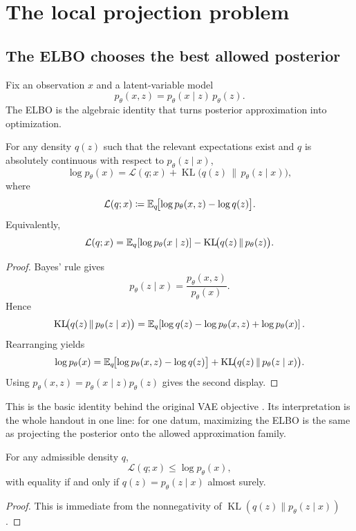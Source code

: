 \documentclass[11pt]{article}
\begin{document}
\section{The local projection problem}
\label{sec:local-projection}

\subsection{The ELBO chooses the best allowed posterior}
\label{subsec:elbo-projection}

Fix an observation \(x\) and a latent-variable model
\[
  p_\theta(x,z)=p_\theta(x\mid z)\,p_\theta(z).
\]
The ELBO is the algebraic identity that turns posterior approximation into optimization.

\begin{proposition}
\label{prop:handout-elbo-identity}
For any density \(q(z)\) such that the relevant expectations exist and \(q\) is absolutely continuous with respect to \(p_\theta(z\mid x)\),
\[
  \log p_\theta(x)
  =
  \mathcal{L}(q;x)
  +
  \operatorname{KL}\!\bigl(q(z)\,\|\,p_\theta(z\mid x)\bigr),
\]
where
\[
  \mathcal{L}(q;x)
  \coloneqq
  \mathbb{E}_q\!\bigl[\log p_\theta(x,z)-\log q(z)\bigr].
\]
Equivalently,
\[
  \mathcal{L}(q;x)
  =
  \mathbb{E}_q[\log p_\theta(x\mid z)]
  -
  \operatorname{KL}\!\bigl(q(z)\,\|\,p_\theta(z)\bigr).
\]
\end{proposition}
\begin{proof}
Bayes' rule gives
\[
  p_\theta(z\mid x)=\frac{p_\theta(x,z)}{p_\theta(x)}.
\]
Hence
\[
  \operatorname{KL}\!\bigl(q(z)\,\|\,p_\theta(z\mid x)\bigr)
  =
  \mathbb{E}_q\!\left[\log q(z)-\log p_\theta(x,z)+\log p_\theta(x)\right].
\]
Rearranging yields
\[
  \log p_\theta(x)
  =
  \mathbb{E}_q\!\bigl[\log p_\theta(x,z)-\log q(z)\bigr]
  +
  \operatorname{KL}\!\bigl(q(z)\,\|\,p_\theta(z\mid x)\bigr).
\]
Using \(p_\theta(x,z)=p_\theta(x\mid z)p_\theta(z)\) gives the second display.%
\end{proof}

This is the basic identity behind the original VAE objective
\citep[\S2.2]{kingma_welling_2014_aevb}.
Its interpretation is the whole handout in one line:
for one datum, maximizing the ELBO is the same as projecting the posterior onto the allowed approximation family.

\begin{corollary}
\label{cor:handout-elbo-lower-bound}
For any admissible density \(q\),
\[
  \mathcal{L}(q;x)\le \log p_\theta(x),
\]
with equality if and only if \(q(z)=p_\theta(z\mid x)\) almost surely.
\end{corollary}
\begin{proof}
This is immediate from the nonnegativity of
\(\operatorname{KL}(q(z)\|p_\theta(z\mid x))\).%
\end{proof}
\end{document}
